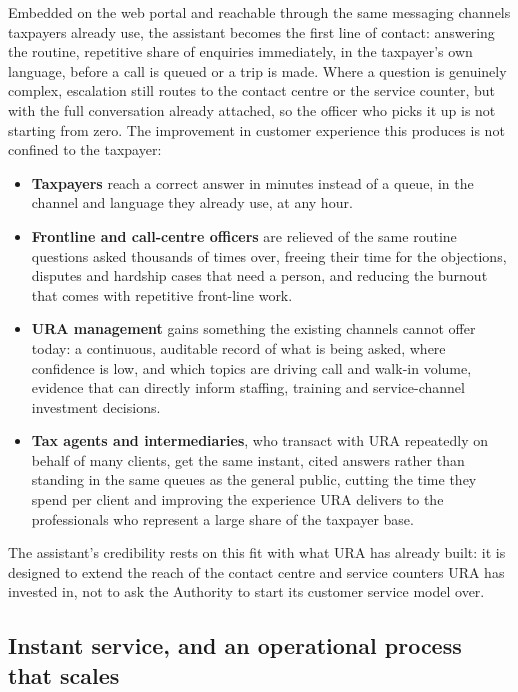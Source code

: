 \documentclass[11pt,a4paper]{article}
\begin{document}
Embedded on the web portal and reachable through the same messaging channels taxpayers already use, the assistant becomes the first line of contact: answering the routine, repetitive share of enquiries immediately, in the taxpayer's own language, before a call is queued or a trip is made. Where a question is genuinely complex, escalation still routes to the contact centre or the service counter, but with the full conversation already attached, so the officer who picks it up is not starting from zero. The improvement in customer experience this produces is not confined to the taxpayer:

\begin{itemize}[topsep=0.3em, itemsep=0.3em]
  \item \textbf{Taxpayers} reach a correct answer in minutes instead of a queue, in the channel and language they already use, at any hour.
  \item \textbf{Frontline and call-centre officers} are relieved of the same routine questions asked thousands of times over, freeing their time for the objections, disputes and hardship cases that need a person, and reducing the burnout that comes with repetitive front-line work.
  \item \textbf{URA management} gains something the existing channels cannot offer today: a continuous, auditable record of what is being asked, where confidence is low, and which topics are driving call and walk-in volume, evidence that can directly inform staffing, training and service-channel investment decisions.
  \item \textbf{Tax agents and intermediaries}, who transact with URA repeatedly on behalf of many clients, get the same instant, cited answers rather than standing in the same queues as the general public, cutting the time they spend per client and improving the experience URA delivers to the professionals who represent a large share of the taxpayer base.
\end{itemize}

The assistant's credibility rests on this fit with what URA has already built: it is designed to extend the reach of the contact centre and service counters URA has invested in, not to ask the Authority to start its customer service model over.

\subsection*{Instant service, and an operational process that scales}
\end{document}
